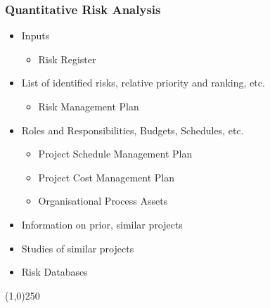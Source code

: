 \begin{frame}
\frametitle{Quantitative Risk Analysis}
\begin{itemize}
\item Inputs
\begin{itemize}
	\item Risk Register
\end{itemize}
\item List of identified risks, relative priority and ranking, etc.
\begin{itemize}
	\item Risk Management Plan
\end{itemize}
\item Roles and Responsibilities, Budgets, Schedules, etc.
\begin{itemize}
	\item Project Schedule Management Plan
\item Project Cost Management Plan
\item Organisational Process Assets
\end{itemize}
\item Information on prior, similar projects
\item Studies of similar projects
\item Risk Databases
\end{itemize}
\end{frame}\begin{center}\line(1,0){250}\end{center}







